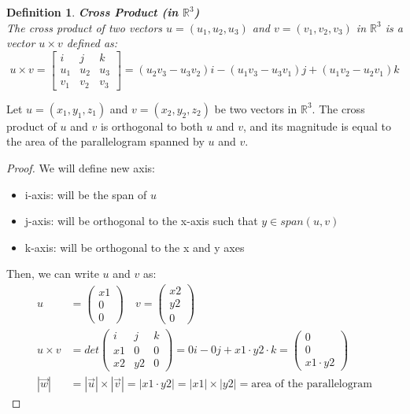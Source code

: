 \documentclass[11pt]{book} %
\newtheorem{definition}{Definition}[section]
\begin{document}
\begin{definition}{\textbf{Cross Product (in $\mathbb{R}^3$)}} \\
    The cross product of two vectors \( u = (u_1, u_2, u_3) \) and \( v = (v_1, v_2, v_3) \) in \( \mathbb{R}^3 \) is a vector \( u \times v \) defined as:
    \[
    u \times v = \begin{bmatrix} i & j & k \\ u_1 & u_2 & u_3 \\ v_1 & v_2 & v_3 \end{bmatrix} = (u_2 v_3 - u_3 v_2) i - (u_1 v_3 - u_3 v_1) j + (u_1 v_2 - u_2 v_1) k
    \]
\end{definition}

Let \( u = (x_1, y_1, z_1) \) and \( v = (x_2, y_2, z_2) \) be two vectors in \( \mathbb{R}^3 \). 
The cross product of \( u \) and \( v \) is orthogonal to both \( u \) and \( v \), and its magnitude is equal to the area of the parallelogram spanned by \( u \) and \( v \).
\begin{proof}
    We will define new axis: 
    \begin{itemize}
        \item i-axis: will be the span of \( u \)
        \item j-axis: will be orthogonal to the x-axis such that \( y \in span({u, v}) \)
        \item k-axis: will be orthogonal to the x and y axes
    \end{itemize}
    Then, we can write \( u \) and \( v \) as:
    \begin{align*}
        u &= \begin{pmatrix}x1 \\ 0 \\ 0\end{pmatrix} \quad v = \begin{pmatrix}x2 \\ y2 \\ 0\end{pmatrix} \\
        u \times v &= det\begin{pmatrix}i & j & k \\ x1 & 0 & 0 \\ x2 & y2 & 0\end{pmatrix} = 
         0 i - 0 j + x1 \cdot y2 \cdot k = \begin{pmatrix}0 \\ 0 \\ x1 \cdot y2\end{pmatrix} \\
         | \vec{w} | &= | \vec{u} | \times | \vec{v} | = | x1 \cdot y2 | = | x1 | \times | y2 | = \text{area of the parallelogram}
    \end{align*}
\end{proof}
\end{document}
